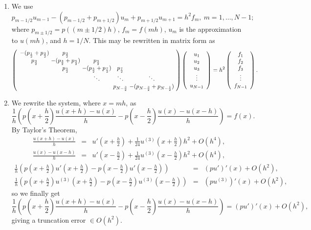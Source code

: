 \documentclass{article}
\begin{document}
\begin{enumerate}
\begin{enumerate}
\item We use
\[p_{m-1/2} u_{m-1} - \left( p_{m-1/2} + p_{m+1/2} \right) u_m + p_{m+1/2} u_{m+1} = h^2 f_m, \ m = 1, \ldots, N - 1;\]
where \(p_{m\pm1/2} = p((m\pm1/2)h)\), \(f_m = f(mh)\), \(u_m\) is the approximation to \(u(mh)\), and \(h = 1/N\).  This may be rewritten in matrix form as
\[\left( \begin{array}{*{5}{c@{\ }}}
         -(p_{\frac{1}{2}} + p_{\frac{3}{2}}) & p_{\frac{3}{2}} \\
         p_{\frac{3}{2}} & -(p_{\frac{3}{2}} + p_{\frac{5}{2}}) & p_{\frac{5}{2}} \\
         & p_{\frac{5}{2}} & -(p_{\frac{5}{2}} + p_{\frac{7}{2}}) & p_{\frac{7}{2}} \\
         & & \ddots & \ddots & \ddots \\
         & & & p_{N-\frac{3}{2}} & -(p_{N-\frac{3}{2}} + p_{N-\frac{1}{2}}) \\
         \end{array} \right)
  \left( \begin{array}{c} u_1 \\ u_2 \\ u_3 \\ \vdots \\ u_{N-1} \end{array} \right)
  = h^2 \left( \begin{array}{c} f_1 \\ f_2 \\ f_3 \\ \vdots \\ f_{N-1} \end{array} \right).\]

\item We rewrite the system, where \(x = mh\), as
\[\frac{1}{h} \left( p \left( x + \frac{h}{2} \right) \frac{u(x + h) - u(x)}{h} - p \left( x - \frac{h}{2} \right) \frac{u(x) - u(x - h)}{h} \right) = f(x).\]
By Taylor's Theorem,
\begin{eqnarray*}
\frac{u(x + h) - u(x)}{h} & = & u' \left( x + \frac{h}{2} \right) + \frac{1}{24} u^{(3)} \left( x + \frac{h}{2} \right) h^2 + O(h^4), \\
\frac{u(x) - u(x - h)}{h} & = & u' \left( x - \frac{h}{2} \right) + \frac{1}{24} u^{(3)} \left( x - \frac{h}{2} \right) h^2 + O(h^4),
\end{eqnarray*}
\begin{eqnarray*}
\frac{1}{h} \left( p \left( x + \frac{h}{2} \right) u' \left( x + \frac{h}{2} \right) - p \left( x - \frac{h}{2} \right) u' \left( x - \frac{h}{2} \right) \right) & = & (pu')'(x) + O(h^2), \\
\frac{1}{h} \left( p \left( x + \frac{h}{2} \right) u^{(3)} \left( x + \frac{h}{2} \right) - p \left( x - \frac{h}{2} \right) u^{(3)} \left( x - \frac{h}{2} \right) \right) & = & \left( pu^{(3)} \right)'(x) + O(h^2),
\end{eqnarray*}
so we finally get
\[\frac{1}{h} \left( p \left( x + \frac{h}{2} \right) \frac{u(x + h) - u(x)}{h} - p \left( x - \frac{h}{2} \right) \frac{u(x) - u(x - h)}{h} \right) = (pu')'(x) + O(h^2),\]
giving a truncation error \(\in O(h^2)\).


\end{enumerate}
\end{enumerate}
\end{document}
